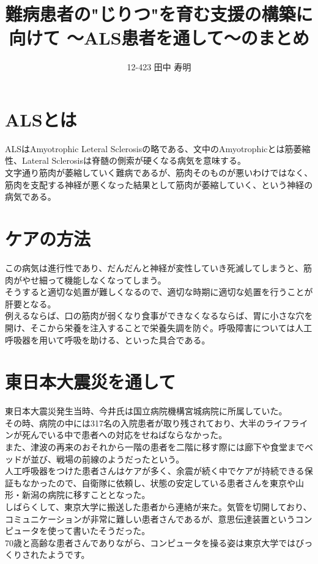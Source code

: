 \documentclass{jsarticle}
\begin{document}
 
 \begin{titlepage}
  \title{難病患者の"じりつ"を育む支援の構築に向けて 〜ALS患者を通して〜のまとめ}
  \author{12-423 田中 寿明}
 \end{titlepage}
 
 \section{ALSとは}
 ALSはAmyotrophic Leteral Sclerosisの略である、文中のAmyotrophicとは筋萎縮性、Lateral Sclerosisは脊髄の側索が硬くなる病気を意味する。\\
 文字通り筋肉が萎縮していく難病であるが、筋肉そのものが悪いわけではなく、筋肉を支配する神経が悪くなった結果として筋肉が萎縮していく、という神経の病気である。
 
 \section{ケアの方法}
 この病気は進行性であり、だんだんと神経が変性していき死滅してしまうと、筋肉がやせ細って機能しなくなってしまう。\\
 そうすると適切な処置が難しくなるので、適切な時期に適切な処置を行うことが肝要となる。\\
 
 例えるならば、口の筋肉が弱くなり食事ができなくなるならば、胃に小さな穴を開け、そこから栄養を注入することで栄養失調を防ぐ。呼吸障害については人工呼吸器を用いて呼吸を助ける、といった具合である。
 
 \section{東日本大震災を通して}
 東日本大震災発生当時、今井氏は国立病院機構宮城病院に所属していた。\\
 その時、病院の中には317名の入院患者が取り残されており、大半のライフラインが死んでいる中で患者への対応をせねばならなかった。\\
 また、津波の再来のおそれから一階の患者を二階に移す際には廊下や食堂までベッドが並び、戦場の前線のようだったという。\\
 
 人工呼吸器をつけた患者さんはケアが多く、余震が続く中でケアが持続できる保証もなかったので、自衛隊に依頼し、状態の安定している患者さんを東京や山形・新潟の病院に移すこととなった。\\
 
 しばらくして、東京大学に搬送した患者から連絡が来た。気管を切開しており、コミュニケーションが非常に難しい患者さんであるが、意思伝達装置というコンピュータを使って書いたそうだった。\\
 70歳と高齢な患者さんでありながら、コンピュータを操る姿は東京大学ではびっくりされたようです。
 
\end{document}
